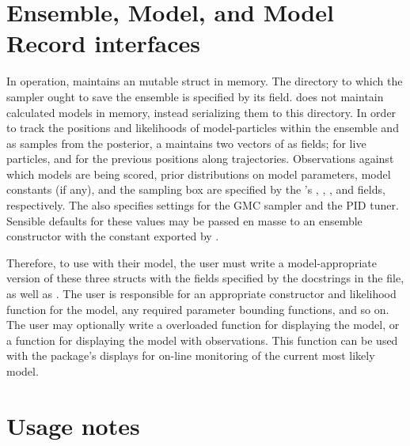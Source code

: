 \section{Ensemble, Model, and Model Record interfaces}
In operation,  maintains an  mutable struct in memory. The directory to which the sampler ought to save the ensemble is specified by its  field.  does not maintain calculated models in memory, instead serializing them to this directory. In order to track the positions and likelihoods of model-particles within the ensemble and as samples from the posterior, a  maintains two vectors of  as fields;  for live particles, and  for the previous positions along trajectories. Observations against which models are being scored, prior distributions on model parameters, model constants (if any), and the sampling box are specified by the 's , , , and  fields, respectively. The  also specifies settings for the GMC sampler and the PID tuner. Sensible defaults for these values may be passed en masse to an ensemble constructor with the  constant exported by .

Therefore, to use  with their model, the user must write a model-appropriate version of these three structs with the fields specified by the docstrings in the  file, as well as . The user is responsible for an appropriate constructor and likelihood function for the model, any required parameter bounding functions, and so on. The user may optionally write a overloaded  function for displaying the model, or a  function for displaying the model with observations. This function can be used with the package's  displays for on-line monitoring of the current most likely model.

\section{Usage notes}
